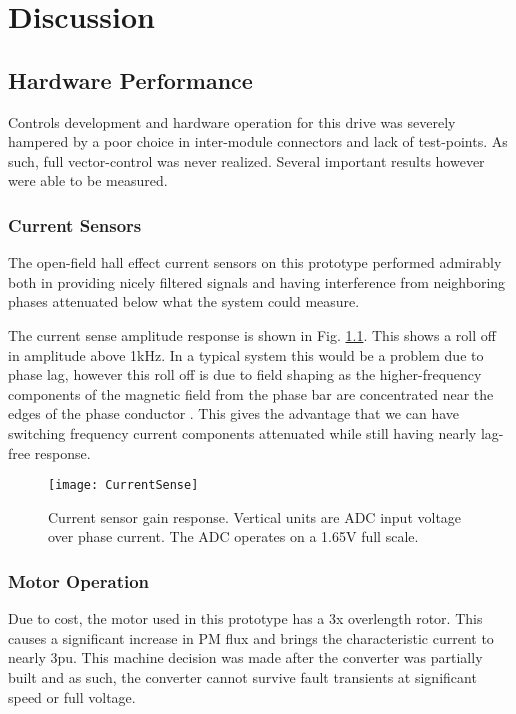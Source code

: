\chapter{Discussion}

\section{Hardware Performance}
Controls development and hardware operation for this drive was severely
hampered by a poor choice in inter-module connectors and lack of test-points.
As such, full vector-control was never realized.  Several important results
however were able to be measured.

\subsection{Current Sensors}
The open-field hall effect current sensors on this prototype performed
admirably both in providing nicely filtered signals and having interference
from neighboring phases attenuated below what the system could measure.

The current sense amplitude response is shown in Fig.
\ref{figCurrentResponse}.
This shows a roll off in amplitude above 1kHz.
In a typical system this would be a problem due to phase lag, however this
roll off is due to field shaping as the higher-frequency components of the
magnetic field from the phase bar are concentrated near the edges of the phase
conductor \cite{Schneider10}.
This gives the advantage that we can have switching frequency current
components attenuated while still having nearly lag-free response.

\begin{figure}[htbp]
	\centering
	\label{figCurrentResponse}
	\texttt{[image: CurrentSense]}
	\caption{Current sensor gain response.  Vertical units are ADC input voltage
	over phase current.  The ADC operates on a 1.65V full scale.}
\end{figure}

\subsection{Motor Operation}
Due to cost, the motor used in this prototype has a 3x overlength rotor.  This
causes a significant increase in PM flux and brings the characteristic current
to nearly 3pu.
This machine decision was made after the converter was partially built and as
such, the converter cannot survive fault transients at significant speed or
full voltage.

